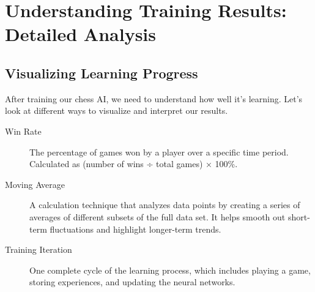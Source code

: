 \documentclass[11pt]{article}
\newenvironment{termbox}[1]
  {\begin{tcolorbox}[colback=blue!5!white,colframe=blue!75!black,title=#1,fonttitle=\bfseries]}
  {\end{tcolorbox}}
\begin{document}
\section{Understanding Training Results: Detailed Analysis}

\subsection{Visualizing Learning Progress}

After training our chess AI, we need to understand how well it's learning. Let's look at different ways to visualize and interpret our results.

\begin{termbox}{Key Technical Terms in Learning Analysis}
\begin{description}
    \item[Win Rate] The percentage of games won by a player over a specific time period. Calculated as (number of wins ÷ total games) × 100\%.
    
    \item[Moving Average] A calculation technique that analyzes data points by creating a series of averages of different subsets of the full data set. It helps smooth out short-term fluctuations and highlight longer-term trends.
    
    \item[Training Iteration] One complete cycle of the learning process, which includes playing a game, storing experiences, and updating the neural networks.
\end{description}
\end{termbox}
\end{document}
